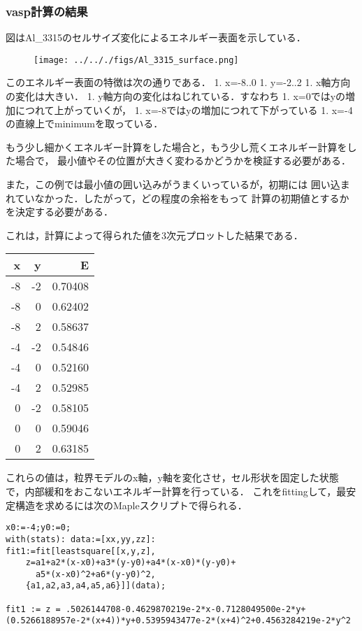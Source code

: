 \documentclass[11pt,dvipdfmx]{jsarticle}
\begin{document}
    \subsubsection{vasp計算の結果}\label{vaspux8a08ux7b97ux306eux7d50ux679c}

    図はAl\_3315のセルサイズ変化によるエネルギー表面を示している．

\begin{figure}[H]
\centering
\begin{center}
\texttt{[image: ../.././figs/Al\_3315\_surface.png]}
\end{center}
\caption{}

\label{fig:}
\end{figure}

    このエネルギー表面の特徴は次の通りである． 1. x=-8..0 1. y=-2..2 1.
x軸方向の変化は大きい． 1. y軸方向の変化はねじれている．すなわち 1.
x=0ではyの増加につれて上がっていくが， 1.
x=-8ではyの増加につれて下がっている 1.
x=-4の直線上でminimumを取っている．

もう少し細かくエネルギー計算をした場合と，もう少し荒くエネルギー計算をした場合で，
最小値やその位置が大きく変わるかどうかを検証する必要がある．

また，この例では最小値の囲い込みがうまくいっているが，初期には
囲い込まれていなかった．したがって，どの程度の余裕をもって
計算の初期値とするかを決定する必要がある．

    これは，計算によって得られた値を3次元プロットした結果である．

\begin{longtable}[]{@{}rrr@{}}
\toprule
x & y & E\tabularnewline
\midrule
\endhead
-8 & -2 & 0.70408\tabularnewline
-8 & 0 & 0.62402\tabularnewline
-8 & 2 & 0.58637\tabularnewline
-4 & -2 & 0.54846\tabularnewline
-4 & 0 & 0.52160\tabularnewline
-4 & 2 & 0.52985\tabularnewline
0 & -2 & 0.58105\tabularnewline
0 & 0 & 0.59046\tabularnewline
0 & 2 & 0.63185\tabularnewline
\bottomrule
\end{longtable}

これらの値は，粒界モデルのx軸，y軸を変化させ，セル形状を固定した状態で，内部緩和をおこないエネルギー計算を行っている．
これをfittingして，最安定構造を求めるには次のMapleスクリプトで得られる．

\begin{verbatim}
x0:=-4;y0:=0;
with(stats): data:=[xx,yy,zz]: 
fit1:=fit[leastsquare[[x,y,z], 
    z=a1+a2*(x-x0)+a3*(y-y0)+a4*(x-x0)*(y-y0)+
      a5*(x-x0)^2+a6*(y-y0)^2, 
    {a1,a2,a3,a4,a5,a6}]](data);

fit1 := z = .5026144708-0.4629870219e-2*x-0.7128049500e-2*y+
(0.5266188957e-2*(x+4))*y+0.5395943477e-2*(x+4)^2+0.4563284219e-2*y^2
\end{verbatim}
\end{document}

